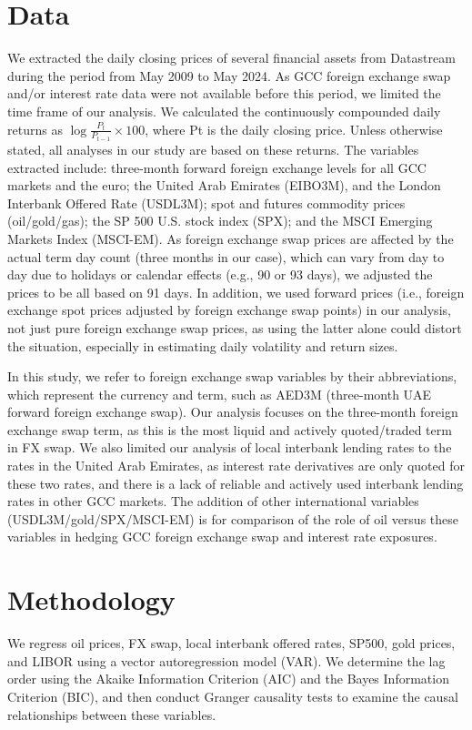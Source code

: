 \documentclass[12pt]{article}
\begin{document}
\begin{sloppypar}
\section{Data}
We extracted the daily closing prices of several financial assets from Datastream during the period from May 2009 to May 2024. As GCC foreign exchange swap and/or interest rate data were not available before this period, we limited the time frame of our analysis. We calculated the continuously compounded daily returns as $\log \frac{P_t}{P_{t-1}}\times 100$, where Pt is the daily closing price. Unless otherwise stated, all analyses in our study are based on these returns. The variables extracted include: three-month forward foreign exchange levels for all GCC markets and the euro; the United Arab Emirates (EIBO3M), and the London Interbank Offered Rate (USDL3M); spot and futures commodity prices (oil/gold/gas); the SP 500 U.S. stock index (SPX); and the MSCI Emerging Markets Index (MSCI-EM). As foreign exchange swap prices are affected by the actual term day count (three months in our case), which can vary from day to day due to holidays or calendar effects (e.g., 90 or 93 days), we adjusted the prices to be all based on 91 days. In addition, we used forward prices (i.e., foreign exchange spot prices adjusted by foreign exchange swap points) in our analysis, not just pure foreign exchange swap prices, as using the latter alone could distort the situation, especially in estimating daily volatility and return sizes. 

In this study, we refer to foreign exchange swap variables by their abbreviations, which represent the currency and term, such as AED3M (three-month UAE forward foreign exchange swap). Our analysis focuses on the three-month foreign exchange swap term, as this is the most liquid and actively quoted/traded term in FX swap. We also limited our analysis of local interbank lending rates to the rates in  the United Arab Emirates, as interest rate derivatives are only quoted for these two rates, and there is a lack of reliable and actively used interbank lending rates in other GCC markets. The addition of other international variables (USDL3M/gold/SPX/MSCI-EM) is for comparison of the role of oil versus these variables in hedging GCC foreign exchange swap and interest rate exposures.

\newpage
\section{Methodology}
We regress oil prices, FX swap, local interbank offered rates, SP500, gold prices, and LIBOR using a vector autoregression model (VAR). We determine the lag order using the Akaike Information Criterion (AIC) and the Bayes Information Criterion (BIC), and then conduct Granger causality tests to examine the causal relationships between these variables.


\end{sloppypar}
\end{document}

